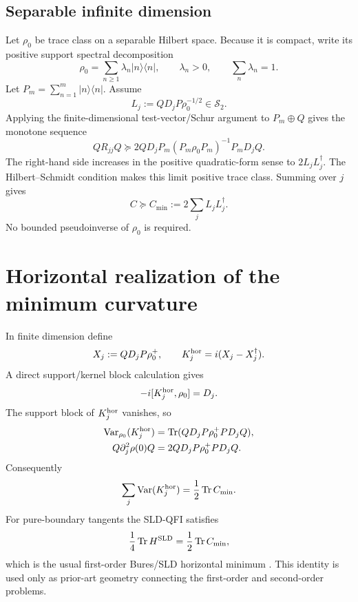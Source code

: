 \documentclass[aps,pra,preprint,nofootinbib]{revtex4-2}
\newcommand{\Tr}{\operatorname{Tr}}
\newcommand{\Var}{\operatorname{Var}}
\newcommand{\rhozero}{\rho_0}
\newcommand{\Cmin}{C_{\min}}
\newcommand{\Cker}{C}
\begin{document}
\subsection{Separable infinite dimension}

Let $\rhozero$ be trace class on a separable Hilbert space. Because it is compact, write its positive support spectral decomposition
\begin{equation}
 \rhozero=\sum_{n\ge1}\lambda_n|n\rangle\langle n|,
 \qquad \lambda_n>0,
 \qquad \sum_n\lambda_n=1.
\end{equation}
Let $P_m=\sum_{n=1}^m|n\rangle\langle n|$. Assume
\begin{equation}
 L_j:=QD_jP\rhozero^{-1/2}\in\mathcal S_2.
 \label{eq:sup-HS}
\end{equation}
Applying the finite-dimensional test-vector/Schur argument to $P_m\oplus Q$ gives the monotone sequence
\begin{equation}
 QR_{jj}Q\succeq2QD_jP_m(P_m\rhozero P_m)^{-1}P_mD_jQ.
\end{equation}
The right-hand side increases in the positive quadratic-form sense to $2L_jL_j^\dagger$. The Hilbert--Schmidt condition makes this limit positive trace class. Summing over $j$ gives
\begin{equation}
 \Cker\succeq\Cmin:=2\sum_jL_jL_j^\dagger.
 \label{eq:sup-CminInfinite}
\end{equation}
No bounded pseudoinverse of $\rhozero$ is required.

\section{Horizontal realization of the minimum curvature}

In finite dimension define
\begin{equation}
 X_j:=QD_jP\rhozero^+,
 \qquad
 K_j^{\rm hor}=i(X_j-X_j^\dagger).
 \label{eq:sup-horizontalK}
\end{equation}
A direct support/kernel block calculation gives
\begin{equation}
 -i[K_j^{\rm hor},\rhozero]=D_j.
\end{equation}
The support block of $K_j^{\rm hor}$ vanishes, so
\begin{align}
 \Var_{\rhozero}(K_j^{\rm hor})
 &=\Tr(QD_jP\rhozero^+PD_jQ),\\
 Q\partial_j^2\rho(0)Q
 &=2QD_jP\rhozero^+PD_jQ.
\end{align}
Consequently
\begin{equation}
 \sum_j\Var(K_j^{\rm hor})=\frac12\Tr\Cmin.
 \label{eq:sup-horizontalcost}
\end{equation}
For pure-boundary tangents the SLD-QFI satisfies
\begin{equation}
 \frac14\Tr H^{\rm SLD}=\frac12\Tr\Cmin,
\end{equation}
which is the usual first-order Bures/SLD horizontal minimum \cite{BraunsteinCaves1994}. This identity is used only as prior-art geometry connecting the first-order and second-order problems.
\end{document}
